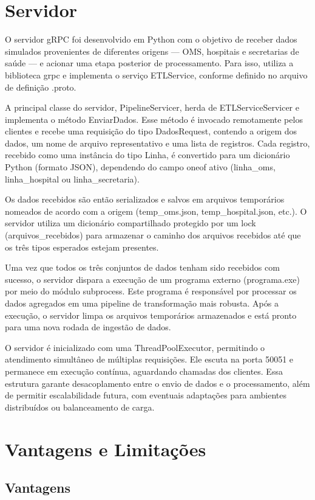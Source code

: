 \documentclass{article}
\begin{document}
\section{Servidor}
O servidor gRPC foi desenvolvido em Python com o objetivo de receber dados simulados provenientes de diferentes origens — OMS, hospitais e secretarias de saúde — e acionar uma etapa posterior de processamento. Para isso, utiliza a biblioteca grpc e implementa o serviço ETLService, conforme definido no arquivo de definição .proto.

A principal classe do servidor, PipelineServicer, herda de ETLServiceServicer e implementa o método EnviarDados. Esse método é invocado remotamente pelos clientes e recebe uma requisição do tipo DadosRequest, contendo a origem dos dados, um nome de arquivo representativo e uma lista de registros. Cada registro, recebido como uma instância do tipo Linha, é convertido para um dicionário Python (formato JSON), dependendo do campo oneof ativo (linha\_oms, linha\_hospital ou linha\_secretaria).

Os dados recebidos são então serializados e salvos em arquivos temporários nomeados de acordo com a origem (temp\_oms.json, temp\_hospital.json, etc.). O servidor utiliza um dicionário compartilhado protegido por um lock (arquivos\_recebidos) para armazenar o caminho dos arquivos recebidos até que os três tipos esperados estejam presentes.

Uma vez que todos os três conjuntos de dados tenham sido recebidos com sucesso, o servidor dispara a execução de um programa externo (programa.exe) por meio do módulo subprocess. Este programa é responsável por processar os dados agregados em uma pipeline de transformação mais robusta. Após a execução, o servidor limpa os arquivos temporários armazenados e está pronto para uma nova rodada de ingestão de dados.

O servidor é inicializado com uma ThreadPoolExecutor, permitindo o atendimento simultâneo de múltiplas requisições. Ele escuta na porta 50051 e permanece em execução contínua, aguardando chamadas dos clientes. Essa estrutura garante desacoplamento entre o envio de dados e o processamento, além de permitir escalabilidade futura, com eventuais adaptações para ambientes distribuídos ou balanceamento de carga.

\section{Vantagens e Limitações}
\subsection{Vantagens}
\end{document}
